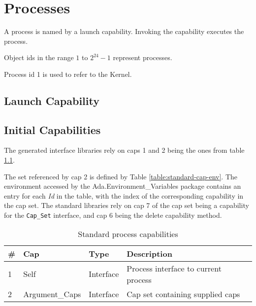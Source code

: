 \chapter{Processes}

A process is named by a launch capability.  Invoking the capability executes the process.

Object ids in the range $1$ to $2^{24} - 1$ represent processes.

Process id 1 is used to refer to the Kernel.

\section{Launch Capability}

\section{Initial Capabilities}

The generated interface libraries rely on caps 1 and 2 being the ones from table \ref{table:standard-caps}.

The set referenced by cap 2 is defined by Table \ref{table:standard-cap-env}.
The environment accessed by the Ada.Environment\_Variables package contains an entry for each {\em Id} in the table, with the index of the corresponding capability in the cap set.
The standard libraries rely on cap 7 of the cap set being a capability for the {\tt Cap\_Set} interface, and cap 6 being the delete capability method.

\begin{table}[ht]
\begin{tabular}{l l l l l}
\hline\hline
\# & Cap & Type & Description \\
\hline
1 & Self & Interface & Process interface to current process \\
2 & Argument\_Caps & Interface & Cap set containing supplied caps \\
\hline
\end{tabular}
\caption{Standard process capabilities}
\label{table:standard-caps}
\end{table}

